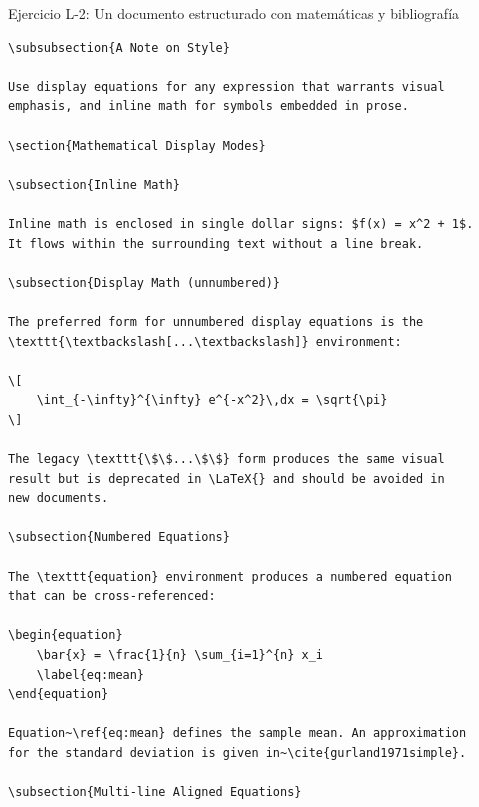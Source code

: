 \begin{infobox}{Ejercicio L-2: Un documento estructurado con matemáticas y bibliografía}
\begin{lstlisting}[style=inlineStyle]
\subsubsection{A Note on Style}

Use display equations for any expression that warrants visual
emphasis, and inline math for symbols embedded in prose.

\section{Mathematical Display Modes}

\subsection{Inline Math}

Inline math is enclosed in single dollar signs: $f(x) = x^2 + 1$.
It flows within the surrounding text without a line break.

\subsection{Display Math (unnumbered)}

The preferred form for unnumbered display equations is the
\texttt{\textbackslash[...\textbackslash]} environment:

\[
    \int_{-\infty}^{\infty} e^{-x^2}\,dx = \sqrt{\pi}
\]

The legacy \texttt{\$\$...\$\$} form produces the same visual
result but is deprecated in \LaTeX{} and should be avoided in
new documents.

\subsection{Numbered Equations}

The \texttt{equation} environment produces a numbered equation
that can be cross-referenced:

\begin{equation}
    \bar{x} = \frac{1}{n} \sum_{i=1}^{n} x_i
    \label{eq:mean}
\end{equation}

Equation~\ref{eq:mean} defines the sample mean. An approximation
for the standard deviation is given in~\cite{gurland1971simple}.

\subsection{Multi-line Aligned Equations}


\end{lstlisting}
\end{infobox}
